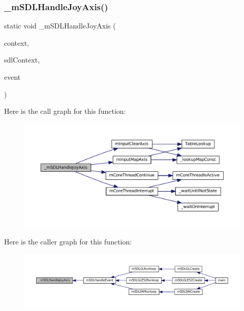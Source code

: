 \subsubsection{\texorpdfstring{\+\_\+m\+S\+D\+L\+Handle\+Joy\+Axis()}{\_mSDLHandleJoyAxis()}}
{\footnotesize\ttfamily static void \+\_\+m\+S\+D\+L\+Handle\+Joy\+Axis (\begin{DoxyParamCaption}\item[{struct m\+Core\+Thread $\ast$}]{context,  }\item[{struct \mbox{\hyperlink{sdl-events_8h_structm_s_d_l_player}{m\+S\+D\+L\+Player}} $\ast$}]{sdl\+Context,  }\item[{const struct S\+D\+L\+\_\+\+Joy\+Axis\+Event $\ast$}]{event }\end{DoxyParamCaption})\hspace{0.3cm}{\ttfamily [static]}}

Here is the call graph for this function\+:
\nopagebreak
\begin{figure}[H]
\begin{center}
\leavevmode
\includegraphics[width=350pt]{sdl-events_8c_a110357fc8005187a13ee71c153747a22_cgraph}
\end{center}
\end{figure}
Here is the caller graph for this function\+:
\nopagebreak
\begin{figure}[H]
\begin{center}
\leavevmode
\includegraphics[width=350pt]{sdl-events_8c_a110357fc8005187a13ee71c153747a22_icgraph}
\end{center}
\end{figure}
\mbox{\label{sdl-events_8c_a8b984affb2018edd5d8ec595f566921c}} 
